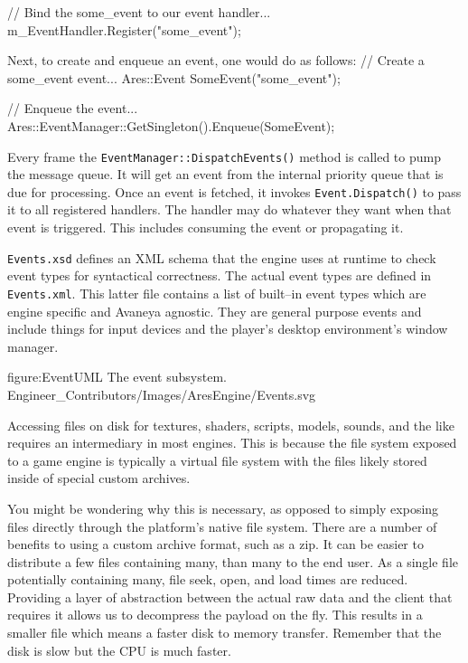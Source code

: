 \startCodeExample
// Bind the some_event to our event handler...
m_EventHandler.Register("some_event");
\stopCodeExample

Next, to create and enqueue an event, one would do as follows:
\startCodeExample
// Create a some_event event...
Ares::Event SomeEvent("some_event");

// Enqueue the event...
Ares::EventManager::GetSingleton().Enqueue(SomeEvent);
\stopCodeExample

Every frame the {\tt EventManager::DispatchEvents()} method is called to pump the message queue. It will get an event from the internal priority queue that is due for processing. Once an event is fetched, it invokes {\tt Event.Dispatch()} to pass it to all registered handlers. The handler may do whatever they want when that event is triggered. This includes consuming the event or propagating it.

{\tt Events.xsd} defines an XML schema that the engine uses at runtime to check event types for syntactical correctness. The actual event types are defined in {\tt Events.xml}. This latter file contains a list of built--in event types which are engine specific and Avaneya agnostic. They are general purpose events and include things for input devices and the player's desktop environment's window manager.

\FullPageDiagram
    {figure:EventUML}
    {The event subsystem.}
    {Engineer_Contributors/Images/AresEngine/Events.svg}

\page 
{}
Accessing files on disk for textures, shaders, scripts, models, sounds, and the like requires an intermediary in most engines. This is because the file system exposed to a game engine is typically a virtual file system with the files likely stored inside of special custom archives.

You might be wondering why this is necessary, as opposed to simply exposing  files directly through the platform's native file system. There are a number of benefits to using a custom archive format, such as a zip. It can be easier to distribute a few files containing many, than many to the end user. As a single file potentially containing many, file seek, open, and load times are reduced. Providing a layer of abstraction between the actual raw data and the client that requires it allows us to decompress the payload on the fly. This results in a smaller file which means a faster disk to memory transfer. Remember that the disk is slow but the CPU is much faster.

